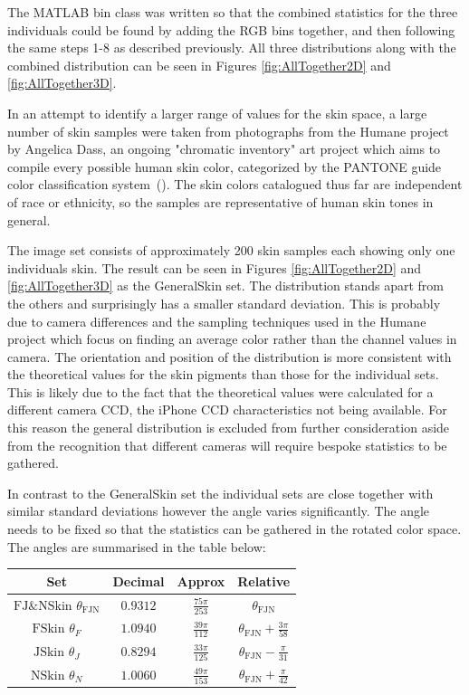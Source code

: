 The MATLAB bin class was written so that the combined statistics for the three individuals could be found by adding the RGB bins together, and then following the same steps 1-8 as described previously. All three distributions along with the combined distribution can be seen in Figures \ref{fig:AllTogether2D} and \ref{fig:AllTogether3D}.


In an attempt to identify a larger range of values for the skin space, a large number of skin samples were taken from photographs from the Humane project by Angelica Dass, an ongoing "chromatic inventory" art project which aims to compile every possible human skin color, categorized by the PANTONE guide color classification system~(\cite{Dass2012}). The skin colors catalogued thus far are independent of race or ethnicity, so the samples are representative of human skin tones in general.

The image set consists of approximately 200 skin samples  each showing only one individuals skin. The result can be seen in Figures \ref{fig:AllTogether2D} and \ref{fig:AllTogether3D} as the GeneralSkin set. The distribution stands apart from the others and surprisingly has a smaller standard deviation. This is probably due to camera differences and the sampling techniques used in the Humane project which focus on finding an average color rather than the channel values in camera. The orientation and position of the distribution is more consistent with the theoretical values for the skin pigments than those for the individual sets. This is likely due to the fact that the theoretical values were calculated for a different camera CCD, the iPhone CCD characteristics not being available. For this reason the general distribution is excluded from further consideration aside from the recognition that different cameras will require bespoke statistics to be gathered. 

In contrast to the GeneralSkin set the individual sets are close together with similar standard deviations however the angle varies significantly. The angle needs to be fixed so that the statistics can be gathered in the rotated color space. The angles are summarised in the table below:

\begin{tabular}{|c|c|c|c|}
\hline   Set                                                             & Decimal   & Approx                       & Relative \\ 
\hline   $\text{FJ$\&$NSkin }\theta _{\text{FJN}}$ & $0.9312$ & $\frac{75 \pi }{253}$ & $\theta _{\text{FJN}}$ \\
\hline   $\text{FSkin }\theta _F$                            & $1.0940$ & $\frac{39 \pi }{112}$ & $\theta _{\text{FJN}}+\frac{3 \pi }{58}$ \\
\hline   $\text{JSkin }\theta _J$                             & $0.8294$ & $\frac{33 \pi }{125}$ & $\theta _{\text{FJN}}-\frac{\pi }{31}$ \\
\hline   $\text{NSkin }\theta _N$                          & $1.0060$ & $\frac{49 \pi }{153}$ & $\theta _{\text{FJN}}+\frac{\pi }{42} $\\
\hline 
\end{tabular} 

